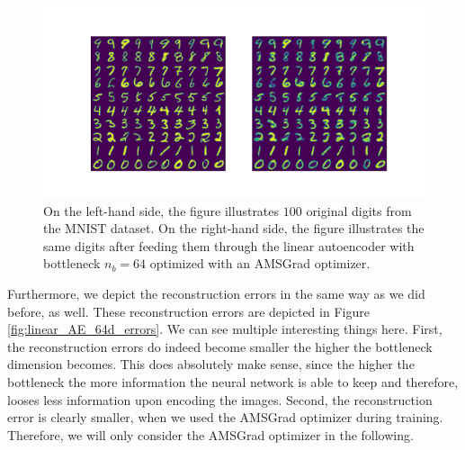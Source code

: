 \begin{figure}
\begin{center}
   \begin{minipage}[b]{\linewidth}
      \includegraphics[trim = 15mm 10mm 15mm 15mm, clip, width=\linewidth]{linear_AE_64d_amsgrad_inference}
	\end{minipage}
\end{center}
\caption{On the left-hand side, the figure illustrates $100$ original digits from the MNIST dataset. On the right-hand side, the figure illustrates the same digits after feeding them through the linear autoencoder with bottleneck $n_b=64$ optimized with an AMSGrad optimizer.}\label{fig:linear_AE_64d_amsgrad_inference}
\end{figure}

Furthermore, we depict the reconstruction errors in the same way as we did before, as well. These reconstruction errors are depicted in Figure \ref{fig:linear_AE_64d_errors}. We can see multiple interesting things here. First, the reconstruction errors do indeed become smaller the higher the bottleneck dimension becomes. This does absolutely make sense, since the higher the bottleneck the more information the neural network is able to keep and therefore, looses less information upon encoding the images. Second, the reconstruction error is clearly smaller, when we used the AMSGrad optimizer during training. Therefore, we will only consider the AMSGrad optimizer in the following.


